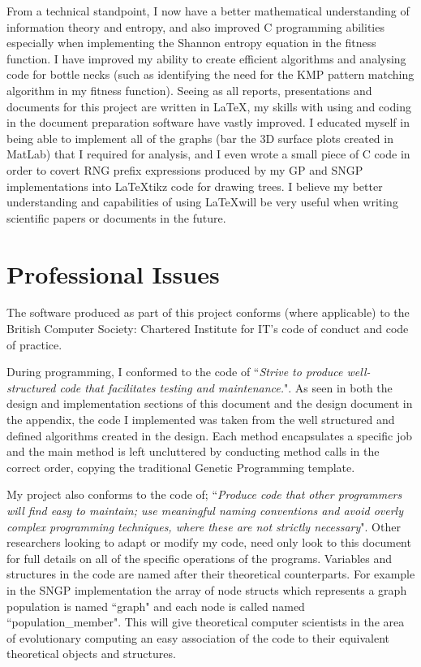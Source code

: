 \documentclass[a4paper,10.5pt]{article}
\begin{document}
From a technical standpoint, I now have a better mathematical understanding of information theory and entropy, and also improved C programming abilities especially when implementing the Shannon entropy equation in the fitness function. I have improved my ability to create efficient algorithms and analysing code for bottle necks (such as identifying the need for the KMP pattern matching algorithm in my fitness function). Seeing as all reports, presentations and documents for this project are written in \LaTeX, my skills with using and coding in the document preparation software have vastly improved. I educated myself in being able to implement all of the graphs (bar the 3D surface plots created in MatLab) that I required for analysis, and I even wrote a small piece of C code in order to covert RNG prefix expressions produced by my GP and SNGP implementations into \LaTeX tikz code for drawing trees. I believe my better understanding and capabilities of using  \LaTeX will be very useful when writing scientific papers or documents in the future.

\newpage
\section{Professional Issues}
The software produced as part of this project conforms (where applicable) to the British Computer Society: Chartered Institute for IT's code of conduct and code of practice.

During programming, I conformed to the code of ``\emph{Strive to produce well-structured code that facilitates testing and maintenance.}". As seen in both the design and implementation sections of this document and the design document in the appendix, the code I implemented was taken from the well structured and defined algorithms created in the design. Each method encapsulates a specific job and the main method is left uncluttered by conducting method calls in the correct order, copying the traditional Genetic Programming template.

My project also conforms to the code of; ``\emph{Produce code that other programmers will find easy to maintain; use meaningful naming conventions and avoid overly complex programming techniques, where these are not strictly necessary}". Other researchers looking to adapt or modify my code, need only look to this document for full details on all of the specific operations of the programs. Variables and structures in the code are named after their theoretical counterparts. For example in the SNGP implementation the array of node structs which represents a graph population is named ``graph" and each node is called named ``population\_member". This will give theoretical computer scientists in the area of evolutionary computing an easy association of the code to their equivalent theoretical objects and structures.
\end{document}
